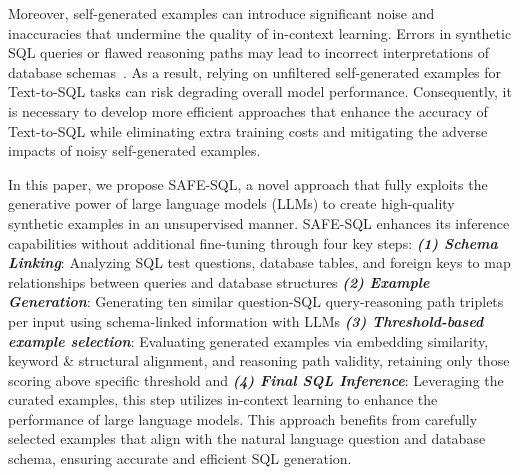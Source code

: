 Moreover, self-generated examples can introduce significant noise and inaccuracies that undermine the quality of in-context learning. Errors in synthetic SQL queries or flawed reasoning paths may lead to incorrect interpretations of database schemas~\cite{noise_text_to_sql}. As a result, relying on unfiltered self-generated examples for Text-to-SQL tasks can risk degrading overall model performance. 
Consequently, it is necessary to develop more efficient approaches that enhance the accuracy of Text-to-SQL while eliminating extra training costs and mitigating the adverse impacts of noisy self-generated examples.

In this paper, we propose SAFE-SQL, a novel approach that fully exploits the generative power of large language models (LLMs) to create high-quality synthetic examples in an unsupervised manner. 
SAFE-SQL enhances its inference capabilities without additional fine-tuning through four key steps: \textbf{\textit{(1) Schema Linking}}:
Analyzing SQL test questions, database tables, and foreign keys to map relationships between queries and database structures
\textbf{\textit{(2) Example Generation}}: 
Generating ten similar question-SQL query-reasoning path triplets per input using schema-linked information with LLMs
\textbf{\textit{(3) Threshold-based example selection}}: 
Evaluating generated examples via embedding similarity, keyword \& structural alignment, and reasoning path validity, retaining only those scoring above specific threshold
and \textbf{\textit{(4) Final SQL Inference}}: 
Leveraging the curated examples, this step utilizes in-context learning to enhance the performance of large language models. This approach benefits from carefully selected examples that align with the natural language question and database schema, ensuring accurate and efficient SQL generation.


